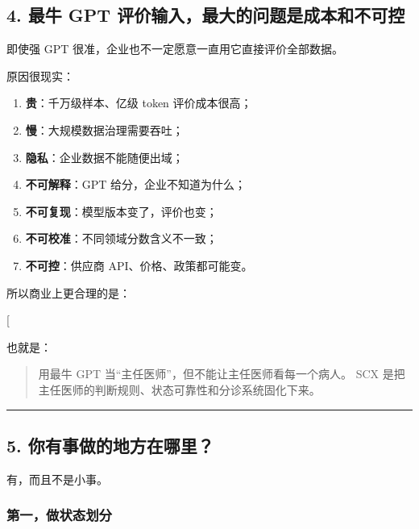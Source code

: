 \documentclass[
  12pt,
]{ctexart}
\providecommand{\tightlist}{%
  \setlength{\itemsep}{0pt}\setlength{\parskip}{0pt}}
\begin{document}
\subsection{4. 最牛 GPT
评价输入，最大的问题是成本和不可控}\label{ux6700ux725b-gpt-ux8bc4ux4ef7ux8f93ux5165ux6700ux5927ux7684ux95eeux9898ux662fux6210ux672cux548cux4e0dux53efux63a7}

即使强 GPT 很准，企业也不一定愿意一直用它直接评价全部数据。

原因很现实：

\begin{enumerate}
\def\labelenumi{\arabic{enumi}.}
\tightlist
\item
  \textbf{贵}：千万级样本、亿级 token 评价成本很高；
\item
  \textbf{慢}：大规模数据治理需要吞吐；
\item
  \textbf{隐私}：企业数据不能随便出域；
\item
  \textbf{不可解释}：GPT 给分，企业不知道为什么；
\item
  \textbf{不可复现}：模型版本变了，评价也变；
\item
  \textbf{不可校准}：不同领域分数含义不一致；
\item
  \textbf{不可控}：供应商 API、价格、政策都可能变。
\end{enumerate}

所以商业上更合理的是：

{[}  \rightarrow {} \rightarrow
{} \rightarrow \text{本地批量评价}{]}

也就是：

\begin{quote}
用最牛 GPT 当``主任医师''，但不能让主任医师看每一个病人。 SCX
是把主任医师的判断规则、状态可靠性和分诊系统固化下来。
\end{quote}

\begin{center}\rule{0.5\linewidth}{0.5pt}\end{center}

\subsection{5.
你有事做的地方在哪里？}\label{ux4f60ux6709ux4e8bux505aux7684ux5730ux65b9ux5728ux54eaux91cc}

有，而且不是小事。

\subsubsection{第一，做状态划分}\label{ux7b2cux4e00ux505aux72b6ux6001ux5212ux5206}
\end{document}
